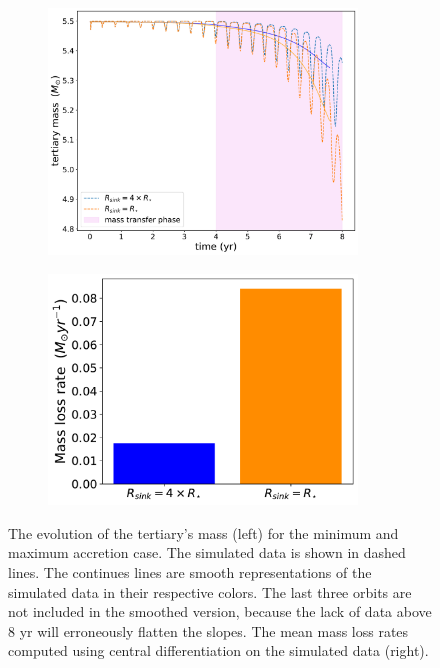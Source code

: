 \begin{figure}[H]
    \centering
    \begin{subfigure}{.5\textwidth}
    \centering
    \includegraphics[width=0.9\textwidth]{Thesis/graphs/accretion_case/accretion_mass_loss.pdf}
    \end{subfigure}%
    \begin{subfigure}{.5\textwidth}
    \centering
    \includegraphics[width=0.9\textwidth]{Thesis/graphs/accretion_case/accretion_giant_mass_loss_rate.pdf}
    \end{subfigure}
    \caption{ The evolution of the tertiary's mass (left) for the minimum and maximum accretion case. The simulated data is shown in dashed lines. The continues lines are smooth representations of the simulated data in their respective colors. The last three orbits are not included in the smoothed version, because the lack of data above $8$ yr will erroneously flatten the slopes. The mean mass loss rates computed using central differentiation on the simulated data (right).}
    \label{fig:accretion_tertiary_mass}
\end{figure}
